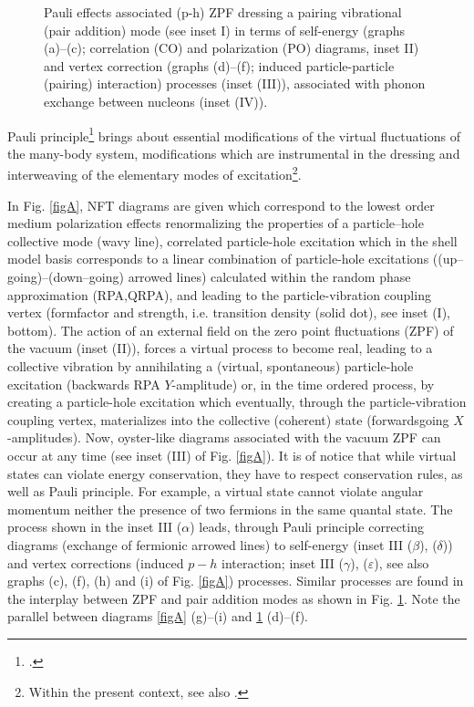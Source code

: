 \begin{subappendices}
\begin{figure}[h!]
\begin{center}
\end{center}
\caption{Pauli effects associated (p-h) ZPF dressing a pairing vibrational (pair addition) mode (see inset I) in terms of self-energy (graphs (a)--(c); correlation (CO) and polarization (PO) diagrams, inset II) and vertex correction (graphs (d)--(f); induced particle-particle (pairing) interaction) processes (inset (III)), associated with phonon exchange between nucleons (inset (IV)).}\label{figB}
\end{figure}
Pauli principle\footnote{\cite{Pauli:25}.} brings about essential modifications of the virtual fluctuations of the many-body system, modifications which are instrumental in the dressing and interweaving of the elementary modes of excitation\footnote{Within the present context, see also \cite{Schrieffer:64}.}.


In Fig.  \ref{figA}, NFT diagrams are given which correspond to the lowest order medium polarization effects renormalizing the properties of a particle--hole collective mode (wavy line), correlated particle-hole excitation which in the shell model basis corresponds to a  linear combination of particle-hole excitations ((up--going)--(down--going) arrowed lines)  calculated within the random phase approximation (RPA,QRPA), and leading to the particle-vibration coupling vertex (formfactor and strength, i.e. transition density (solid dot), see inset (I), bottom). The action of an external field on the zero point fluctuations (ZPF) of the vacuum (inset (II)), forces a virtual process to become real, leading to a collective vibration by annihilating a (virtual, spontaneous) particle-hole excitation (backwards RPA $Y$-amplitude) or, in the time ordered process, by creating a particle-hole excitation which eventually, through the particle-vibration coupling vertex, materializes into the collective (coherent) state (forwardsgoing $X$-amplitudes). Now, oyster-like diagrams associated with the vacuum ZPF can occur at any time (see inset (III) of Fig. \ref{figA}). It is of notice that   while virtual states can violate energy conservation, they have to respect conservation rules, as well as Pauli principle. For example, a virtual state  cannot violate  angular momentum neither the  presence of two fermions in the same quantal state. The process shown in the inset III ($\alpha$) leads, through Pauli principle correcting diagrams (exchange of fermionic arrowed lines) to self-energy (inset III ($\beta$), ($\delta$)) and vertex corrections (induced $p-h$ interaction; inset III ($\gamma$), ($\varepsilon$), see also graphs (c), (f), (h) and (i) of Fig. \ref{figA}) processes. Similar processes are found in the interplay between ZPF 	and pair addition modes as shown in Fig. \ref{figB}. Note the parallel between diagrams \ref{figA} (g)--(i) and \ref{figB} (d)--(f).



\end{subappendices}
